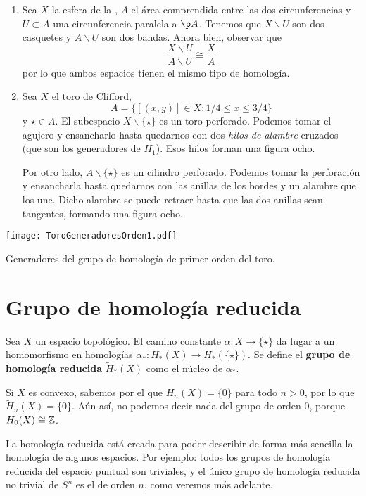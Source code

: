 \begin{example}
\begin{enumerate}
\item Sea $X$ la esfera de la , $A$ el área
comprendida entre las dos circunferencias y $U\subset A$ una circunferencia
paralela a $\p A$. Tenemos que $X\backslash U$ son dos casquetes y
$A\backslash U$ son dos bandas. Ahora bien, observar que
\[\frac{X\backslash U}{A\backslash U} \cong \frac{X}{A}\]
por lo que ambos espacios tienen el mismo tipo de homología.
\item Sea $X$ el toro de Clifford,
\[A=\{[(x,y)] \in X\colon 1/4 \leq x \leq 3/4\}\]
y $\star \in A$. El subespacio $X\backslash\{\star\}$ es un toro
perforado. Podemos tomar el agujero y ensancharlo hasta quedarnos con dos
\emph{hilos de alambre} cruzados (que son los generadores de $H_1$). Esos
hilos forman una figura ocho.

Por otro lado, $A\backslash\{\star\}$ es un cilindro perforado. Podemos tomar
la perforación y ensancharla hasta quedarnos con las anillas de los bordes y
un alambre que los une. Dicho alambre se puede retraer hasta que las dos
anillas sean tangentes, formando una figura ocho.
\end{enumerate}
\end{example}

\begin{marginfigure}
\texttt{[image: ToroGeneradoresOrden1.pdf]}
\caption{Generadores del grupo de homología de primer orden del toro.}
\end{marginfigure}

\section{Grupo de homología reducida}
Sea $X$ un espacio topológico. El camino constante
$\alpha\colon X \to \{\star\}$ da lugar a un homomorfismo en homologías
$\alpha_*\colon H_*(X) \to H_*(\{\star\})$. Se define el \textbf{grupo de
homología reducida} $\tilde H_*(X)$ como el núcleo de $\alpha_*$.

Si $X$ es convexo, sabemos por el  que $H_n(X)=\{0\}$ para
todo $n > 0$, por lo que $\tilde H_n(X)=\{0\}$. Aún así, no podemos decir nada
del grupo de orden 0, porque $H_0(X)\cong \mathbb{Z}$.

La homología reducida está creada para poder describir de forma más sencilla
la homología de algunos espacios. Por ejemplo: todos los grupos de homología
reducida del espacio puntual son triviales, y el único grupo de homología
reducida no trivial de $S^n$ es el de orden $n$, como veremos más adelante.

